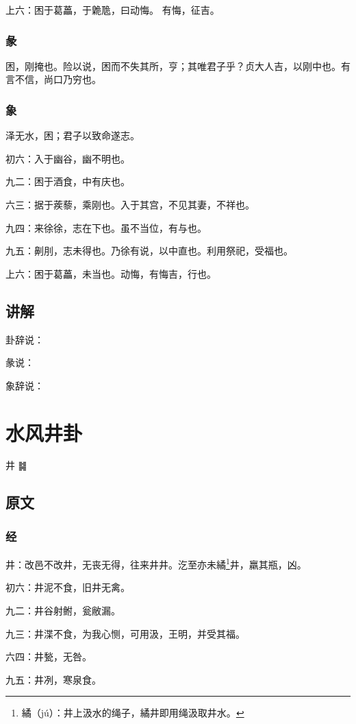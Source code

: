 \documentclass[12pt,oneside]{book}
\begin{document}
上六：困于葛藟，于臲卼，曰动悔。 有悔，征吉。

\subsection{彖}
困，刚掩也。险以说，困而不失其所，亨；其唯君子乎？贞大人吉，以刚中也。有言不信，尚口乃穷也。

\subsection{象}
泽无水，困；君子以致命遂志。

初六：入于幽谷，幽不明也。

九二：困于酒食，中有庆也。

六三：据于蒺藜，乘刚也。入于其宫，不见其妻，不祥也。

九四：来徐徐，志在下也。虽不当位，有与也。

九五：劓刖，志未得也。乃徐有说，以中直也。利用祭祀，受福也。

上六：困于葛藟，未当也。动悔，有悔吉，行也。

\section{讲解}
卦辞说：

彖说：

象辞说：

\chapter{水风井卦}
井 {\Large ䷯}

\section{原文}

\subsection{经}
井：改邑不改井，无丧无得，往来井井。汔至亦未繘\footnote{繘（jú）：井上汲水的绳子，繘井即用绳汲取井水。}井，羸其瓶，凶。

初六：井泥不食，旧井无禽。

九二：井谷射鲋，瓮敝漏。

九三：井渫不食，为我心恻，可用汲，王明，并受其福。

六四：井甃，无咎。

九五：井冽，寒泉食。
\end{document}
